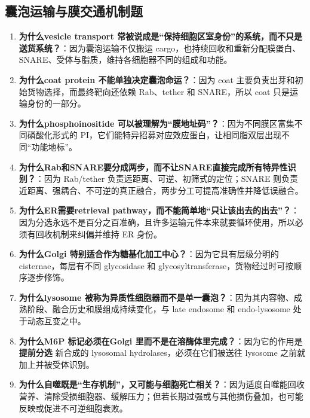 \documentclass[12pt,fontset=none]{ctexart}
\begin{document}
\subsection*{囊泡运输与膜交通机制题}
\begin{enumerate}
\item \textbf{为什么vesicle transport 常被说成是“保持细胞区室身份”的系统，而不只是送货系统？}：因为囊泡运输不仅搬运 cargo，也持续回收和重新分配膜蛋白、SNARE、受体与脂质，维持各细胞器不同的组成和功能。

\item \textbf{为什么coat protein 不能单独决定囊泡命运？}：因为 coat 主要负责出芽和初始货物选择，而最终靶向还依赖 Rab、tether 和 SNARE，所以 coat 只是运输身份的一部分。

\item \textbf{为什么phosphoinositide 可以被理解为“膜地址码”？}：因为不同膜区富集不同磷酸化形式的 PI，它们能特异招募对应效应蛋白，让相同脂双层出现不同“功能地标”。

\item \textbf{为什么Rab和SNARE要分成两步，而不让SNARE直接完成所有特异性识别？}：因为 Rab/tether 负责远距离、可逆、初筛式的定位；SNARE 则负责近距离、强耦合、不可逆的真正融合，两步分工可提高准确性并降低误融合。

\item \textbf{为什么ER需要retrieval pathway，而不能简单地“只让该出去的出去”？}：因为分选永远不是百分之百准确，且许多运输元件本来就要循环使用，所以必须有回收机制来纠偏并维持 ER 身份。

\item \textbf{为什么Golgi 特别适合作为糖基化加工中心？}：因为它具有层级分明的 cisternae，每层有不同 glycosidase 和 glycosyltransferase，货物经过时可按顺序逐步修饰。

\item \textbf{为什么lysosome 被称为异质性细胞器而不是单一囊泡？}：因为其内容物、成熟阶段、融合历史和膜组成持续变化，与 late endosome 和 endo-lysosome 处于动态互变之中。

\item \textbf{为什么M6P 标记必须在Golgi 里而不是在溶酶体里完成？}：因为它的作用是 \textbf{提前分选} 新合成的 lysosomal hydrolases，必须在它们被送往 lysosome 之前就加上并被受体识别。

\item \textbf{为什么自噬既是“生存机制”，又可能与细胞死亡相关？}：因为适度自噬能回收营养、清除受损细胞器、缓解压力；但若长期过强或与其他损伤叠加，也可能反映或促进不可逆细胞衰败。


\end{enumerate}
\end{document}
